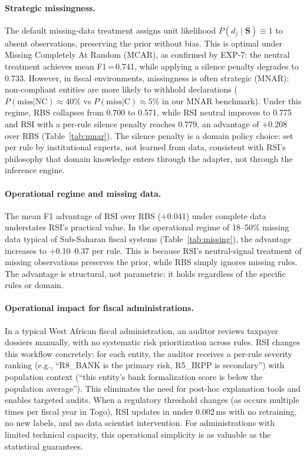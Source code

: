 \documentclass[letterpaper]{article}
\begin{document}
\paragraph{Strategic missingness.}
The default missing-data treatment assigns unit likelihood
$P(d_j \mid \mathbf{S}) \equiv 1$ to absent observations, preserving
the prior without bias. This is optimal under Missing Completely At
Random (MCAR), as confirmed by EXP-7: the neutral treatment achieves
mean F1\,=\,0.741, while applying a silence penalty degrades to 0.733.
However, in fiscal environments, missingness is often strategic
(MNAR): non-compliant entities are more likely to withhold
declarations ($P(\text{miss}|\text{NC}) \approx 40\%$ vs
$P(\text{miss}|\text{C}) \approx 5\%$ in our MNAR benchmark). Under
this regime, RBS collapses from 0.700 to 0.571, while RSI neutral
improves to 0.775 and RSI with a per-rule silence penalty reaches
0.779, an advantage of $+$0.208 over RBS
(Table~\ref{tab:mnar}). The silence penalty is a domain policy
choice: set per rule by institutional experts, not learned from data,
consistent with RSI's philosophy that domain knowledge enters through
the adapter, not through the inference engine.

\paragraph{Operational regime and missing data.}
The mean F1 advantage of RSI over RBS ($+$0.041) under complete data
understates RSI's practical value. In the operational regime of
18--50\% missing data typical of Sub-Saharan fiscal systems
(Table~\ref{tab:missing}), the advantage increases to $+$0.10--0.37
per rule. This is because RSI's neutral-signal treatment of missing
observations preserves the prior, while RBS simply ignores missing
rules. The advantage is structural, not parametric: it holds regardless
of the specific rules or domain.

\paragraph{Operational impact for fiscal administrations.}
In a typical West African fiscal administration, an auditor reviews
taxpayer dossiers manually, with no systematic risk prioritization
across rules. RSI changes this workflow concretely: for each entity,
the auditor receives a per-rule severity ranking (e.g., ``R8\_BANK is
the primary risk, R5\_IRPP is secondary'') with population context
(``this entity's bank formalization score is below the population
average''). This eliminates the need for post-hoc explanation tools and
enables targeted audits. When a regulatory threshold changes (as occurs
multiple times per fiscal year in Togo), RSI updates in under
0.002\,ms with no retraining, no new labels, and no data scientist
intervention. For administrations with limited technical capacity, this
operational simplicity is as valuable as the statistical guarantees.
\end{document}
